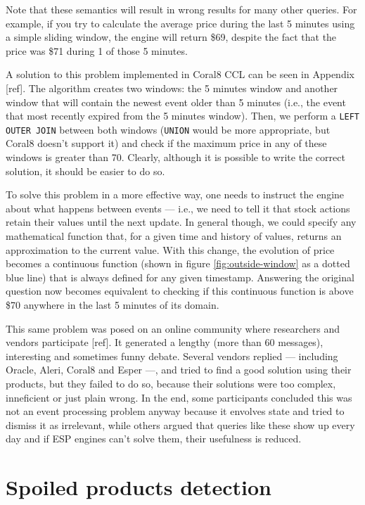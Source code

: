 \documentclass{report}
\begin{document}
Note that these semantics will result in wrong results for many other
queries. For example, if you try to calculate the average price during
the last 5 minutes using a simple sliding window, the engine will
return \$69, despite the fact that the price was \$71 during 1 of
those 5 minutes.

A solution to this problem implemented in Coral8 CCL can be seen in
Appendix [ref]. The algorithm creates two windows: the 5 minutes
window and another window that will contain the newest event older
than 5 minutes (i.e., the event that most recently expired from the 5
minutes window). Then, we perform a \verb=LEFT OUTER JOIN= between
both windows (\verb=UNION= would be more appropriate, but Coral8
doesn't support it) and check if the maximum price in any of these
windows is greater than 70. Clearly, although it is possible to write
the correct solution, it should be easier to do so.

To solve this problem in a more effective way, one needs to instruct
the engine about what happens between events --- i.e., we need to tell
it that stock actions retain their values until the next update. In
general though, we could specify any mathematical function that, for a
given time and history of values, returns an approximation to the
current value. With this change, the evolution of price becomes a
continuous function (shown in figure \ref{fig:outside-window} as a
dotted blue line) that is always defined for any given
timestamp. Answering the original question now becomes equivalent to
checking if this continuous function is above \$70 anywhere in the
last 5 minutes of its domain.

This same problem was posed on an online community where researchers
and vendors participate [ref]. It generated a lengthy (more than 60
messages), interesting and sometimes funny debate. Several vendors
replied --- including Oracle, Aleri, Coral8 and Esper ---, and tried
to find a good solution using their products, but they failed to do
so, because their solutions were too complex, inneficient or just
plain wrong. In the end, some participants concluded this was not an
event processing problem anyway because it envolves state and tried to
dismiss it as irrelevant, while others argued that queries like these
show up every day and if ESP engines can't solve them, their
usefulness is reduced.


\section{Spoiled products detection}
\label{sec:spoiled-products}
\end{document}
